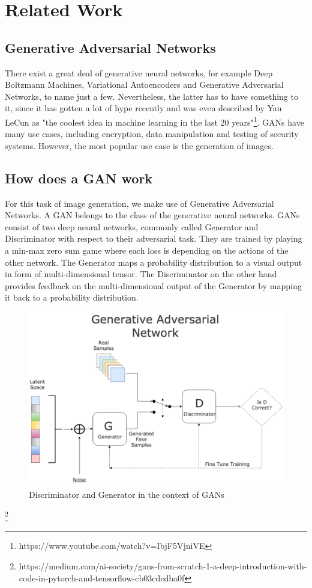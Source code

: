 \section{Related Work}
\subsection{Generative Adversarial Networks}
    There exist a great deal of generative neural networks, for example Deep Boltzmann Machines, Variational Autoencoders and Generative Adversarial Networks, to name just a few. Nevertheless, the latter has to have something to it, since it has gotten a lot of hype recently and was even described by Yan LeCun as "the coolest idea in machine learning in the last 20 years"\footnote{https://www.youtube.com/watch?v=IbjF5VjniVE}. GANs have many use cases, including encryption, data manipulation and testing of security systems. However, the most popular use case is the generation of images.
    
\subsection{How does a GAN work}
	For this task of image generation, we make use of Generative Adversarial Networks. A GAN belongs to the class of the generative neural networks. GANs consist of two deep neural networks, commonly called Generator and Discriminator with respect to their adversarial task. They are trained by playing a min-max zero sum game where each loss is depending on the actions of the other network. The Generator maps a probability distribution to a visual output in form of multi-dimensional tensor. The Discriminator on the other hand provides feedback on the multi-dimensional output of the Generator by mapping it back to a probability distribution. \\
	
	\begin{figure}[htb] 
    	\centering
    	\includegraphics[width=0.7\linewidth]{GAN_structure.pdf}
    	\caption{Discriminator and Generator in the context of GANs}
    	\label{fig:GAN}
    \end{figure}
	\footnote{https://medium.com/ai-society/gans-from-scratch-1-a-deep-introduction-with-code-in-pytorch-and-tensorflow-cb03cdcdba0f}
	
